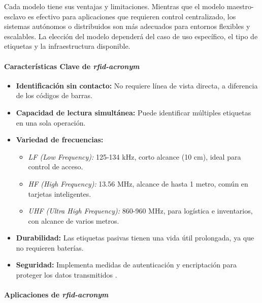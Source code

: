 Cada modelo tiene sus ventajas y limitaciones. Mientras que el modelo maestro-esclavo es efectivo para aplicaciones que requieren control centralizado, los sistemas autónomos o distribuidos son más adecuados para entornos flexibles y escalables. La elección del modelo dependerá del caso de uso específico, el tipo de etiquetas y la infraestructura disponible.

\paragraph{Características Clave de \textit{\acrshort{rfid-acronym}}\\}

\begin{itemize}
    \item \textbf{Identificación sin contacto:} No requiere línea de vista directa, a diferencia de los códigos de barras.
    \item \textbf{Capacidad de lectura simultánea:} Puede identificar múltiples etiquetas en una sola operación.
    \item \textbf{Variedad de frecuencias:}
    \begin{itemize}
        \item \textit{LF (Low Frequency):} 125-134 kHz, corto alcance (10 cm), ideal para control de acceso.
        \item \textit{HF (High Frequency):} 13.56 MHz, alcance de hasta 1 metro, común en tarjetas inteligentes.
        \item \textit{UHF (Ultra High Frequency):} 860-960 MHz, para logística e inventarios, con alcance de varios metros.
    \end{itemize}
    \item \textbf{Durabilidad:} Las etiquetas pasivas tienen una vida útil prolongada, ya que no requieren baterías.
    \item \textbf{Seguridad:} Implementa medidas de autenticación y encriptación para proteger los datos transmitidos \cite{RFidtech, Mechanismiot}.
\end{itemize}

\paragraph{Aplicaciones de \textit{\acrshort{rfid-acronym}}\\}

